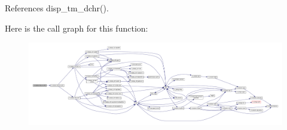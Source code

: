 References disp\+\_\+tm\+\_\+dchr().

Here is the call graph for this function\+:
\nopagebreak
\begin{figure}[H]
\begin{center}
\leavevmode
\includegraphics[width=350pt]{namespacem__display_aa72655968e5accf7c77477693c9f1bfa_cgraph}
\end{center}
\end{figure}
\mbox{\label{namespacem__display_ab6b5841935e6e08ce9d8a293f2e7c18a}} 
